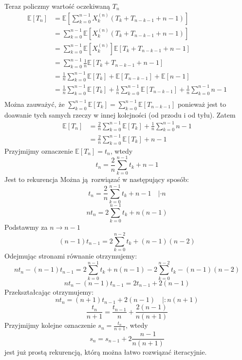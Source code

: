\documentclass[11pt,a4paper]{article}
\begin{document}
Teraz policzmy wartość oczekiwaną $T_n$
\begin{equation*}\begin{aligned}
    \mathbb{E}[T_n]
    &= \mathbb{E}\left[\sum^{n-1}_{k=0} X^{(n)}_{k} (T_k + T_{n-k-1} + n-1)\right] \\
    &= \sum^{n-1}_{k=0} \mathbb{E}[X^{(n)}_{k} (T_k + T_{n-k-1} + n-1)] \\
    &= \sum^{n-1}_{k=0} \mathbb{E}[X^{(n)}_{k}] \mathbb{E}[T_k + T_{n-k-1} + n-1] \\
    &= \sum^{n-1}_{k=0} \frac{1}{n} \mathbb{E}[T_k + T_{n-k-1} + n-1] \\
    &= \frac{1}{n} \sum^{n-1}_{k=0} \mathbb{E}[T_k] + \mathbb{E}[T_{n-k-1}] + \mathbb{E}[n-1] \\
    &= \frac{1}{n} \sum^{n-1}_{k=0} \mathbb{E}[T_k] + \frac{1}{n} \sum^{n-1}_{k=0} \mathbb{E}[T_{n-k-1}] + \frac{1}{n} \sum^{n-1}_{k=0} n-1 \\
\end{aligned}\end{equation*}
Można zauważyć, że $\sum^{n-1}_{k=0} \mathbb{E}[T_k] = \sum^{n-1}_{k=0} \mathbb{E}[T_{n-k-1}]$ ponieważ jest to doawanie tych samych rzeczy w innej kolejności (od przodu i od tyłu). Zatem
\begin{equation*}\begin{aligned}
    \mathbb{E}[T_n]
    &= \frac{2}{n} \sum^{n-1}_{k=0} \mathbb{E}[T_k] + \frac{1}{n} \sum^{n-1}_{k=0} n-1 \\
    &= \frac{2}{n} \sum^{n-1}_{k=0} \mathbb{E}[T_k] + n-1
\end{aligned}\end{equation*}
Przyjmijmy oznaczenie $\mathbb{E}[T_n] = t_n$, wtedy
\[
    t_n = \frac{2}{n} \sum^{n-1}_{k=0} t_k + n-1
\]
Jest to rekurencja %
Można ją rozwiązać w następujący sposób:
\[
    t_n = \frac{2}{n} \sum^{n-1}_{k=0} t_k + n-1 \quad | \cdot n
\]
\[
    nt_n = 2 \sum^{n-1}_{k=0} t_k + n(n-1)
\]
Podstawmy za $n \rightarrow n-1$
\[
    (n-1)t_{n-1} = 2 \sum^{n-2}_{k=0} t_k + (n-1)(n-2)
\]
Odejmując stronami równanie otrzymujemy:
\[
    nt_n - (n-1)t_{n-1} = 2 \sum^{n-1}_{k=0} t_k + n(n-1) - 2 \sum^{n-2}_{k=0} t_k - (n-1)(n-2)
\]
\[
    nt_n - (n-1)t_{n-1} = 2t_{n-1} + 2(n-1)
\]
Przekształcając otrzymujemy:
\[
    nt_n = (n+1)t_{n-1} + 2(n-1) \quad | : n(n+1)
\]
\[
    \frac{t_n}{n+1} = \frac{t_{n-1}}{n} + \frac{2(n-1)}{n(n+1)}
\]
Przyjmijmy kolejne oznaczenie $s_n = \frac{t_n}{n+1}$, wtedy
\[
    s_n = s_{n-1} + 2 \frac{n-1}{n(n+1)}
\]
jest już prostą rekurencją, którą można łatwo rozwiązać iteracyjnie.
\end{document}
